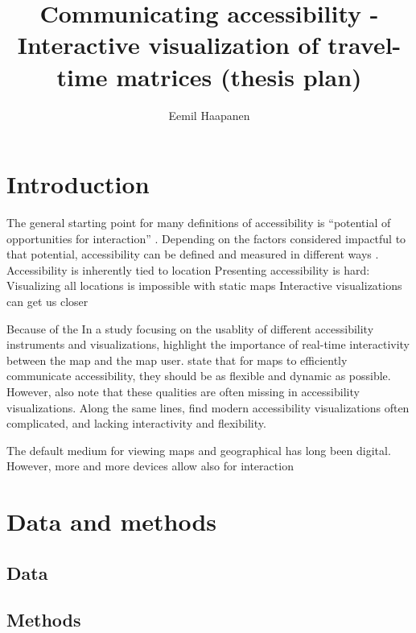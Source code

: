 \documentclass{article}
\title{Communicating accessibility - Interactive visualization of travel-time matrices (thesis  plan)}
\author{Eemil Haapanen}
\begin{document}
\maketitle

\section{Introduction}

The general starting point for many definitions of accessibility is
\enquote{potential of opportunities for interaction} \parencite{han1959}.
Depending on the factors considered impactful to that potential,
accessibility can be defined and measured in different ways \parencite{pap2016}.
Accessibility is inherently tied to location
Presenting accessibility is hard:
Visualizing all locations is impossible with static maps
Interactive visualizations can get us closer

Because of the 
In a study focusing on the usablity of different accessibility instruments and visualizations,  %
\textcite{te2014} highlight the importance of real-time interactivity between the map and the map user.
\textcite{but2018} state that for maps to efficiently communicate accessibility,
they should be as flexible and dynamic as possible.
However, \citeauthor{but2018} also note that these qualities are often missing in accessibility visualizations.
Along the same lines, \textcite{paj2021} find modern accessibility visualizations often complicated,
and lacking interactivity and flexibility.


The default medium for viewing maps and geographical has long been digital.  %
However, more and more devices allow also for interaction \parencite{mei2019}



\section{Data and methods}

\subsection{Data}

\subsection{Methods}

\printbibliography
\end{document}
